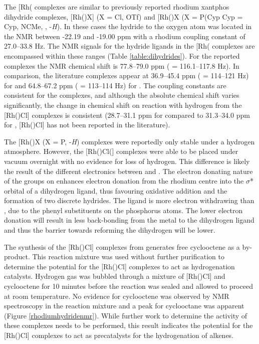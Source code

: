 The [Rh(\tBuxantphosk\ce{)Cl(H)2]} complexes are similar to previously reported rhodium xantphos dihydride complexes,  [Rh(\iPrxantphos)X] (X = Cl, OTf)\cite{Esteruelas2013} and [Rh(\Phxantphos)X\ce{]+} (X = P(\acrshort{Cyp} \acrshort{Cyp} = \acrlong{Cyp}, NCMe, , -\dento{}\emph{H})\cite{Dallanegra2012, Johnson2013, Pawley2010}.   In these cases the hydride \trans{} to the oxygen atom was located in the \proton{} NMR between -22.19 and -19.00 ppm with a rhodium coupling constant of 27.0--33.8 Hz.  The \proton{} NMR signals for the hydride ligands in the [Rh(\tBuxantphosk\ce{)Cl(H)2]} complexes are encompassed within these ranges (Table \ref{table:dihydrides}).  For the reported \tBuxantphos{} complexes the \phosphorus{} NMR chemical shift is 77.8--79.0 ppm (\JRhP{} = 116.1--117.8 Hz).  In comparison, the literature complexes appear at 36.9--45.4 ppm (\JRhP{} = 114--121 Hz) for \Phxantphos{} and 64.8--67.2 ppm (\JRhP{} = 113--114 Hz) for \iPrxantphos{}.  The coupling constants are consistent for the complexes, and although the absolute chemical shift varies significantly, the change in chemical shift on reaction with hydrogen from the [Rh(\tBuxantphos)Cl] complexes is consistent (28.7--31.1 ppm for \iPrxantphos{} compared to 31.3--34.0 ppm for \tBuxantphos{}, [Rh(\Phxantphos)Cl] has not been reported in the literature).  

The [Rh(\Phxantphos)X\ce{]+} (X = P, -\dento{}\emph{H}) complexes were reportedly only stable under a hydrogen atmosphere.\cite{Johnson2013, Dallanegra2012}  However, the [Rh(\tBuxantphos)Cl(] complexes were able to be placed under vacuum overnight with no evidence for loss of hydrogen.  This difference is likely the result of the different electronics between \tBuxantphos{} and \Phxantphos{}.  The electron donating nature of the \tBu{} groups on \tBuxantphos{} enhances electron donation from the rhodium centre into the $\sigma$* orbital of a dihydrogen ligand, thus favouring oxidative addition and the formation of two discrete hydrides.  The \Phxantphos{} ligand is more electron withdrawing than \tBuxantphos{}, due to the phenyl substituents on the phosphorus atoms.  The lower electron donation will result in less back-bonding from the metal to the dihydrogen ligand and thus the barrier towards reforming the dihydrogen will be lower.

The synthesis of the [Rh(\tBuxantphosk)Cl] complexes from  generates free cyclooctene as a by-product.  This reaction mixture was used without further purification to determine the potential for the [Rh(\tBuxantphosk)Cl] complexes to act as hydrogenation catalysts.  Hydrogen gas was bubbled through a mixture of [Rh(\tBuxantphosk)Cl] and cyclooctene for 10 minutes before the reaction was sealed and allowed to proceed at room temperature.  No evidence for cyclooctene was observed by \proton{} NMR spectroscopy in the reaction mixture and a peak for cyclooctane was apparent (Figure \ref{rhodiumhydridenmr}).  While further work to determine the activity of these complexes needs to be performed, this result indicates the potential for the [Rh(\tBuxantphosk)Cl] complexes to act as precatalysts for the hydrogenation of alkenes.  

